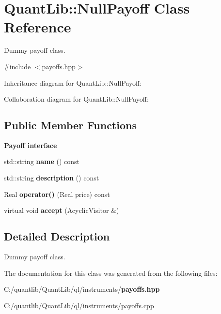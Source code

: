 \section{Quant\+Lib\+:\+:Null\+Payoff Class Reference}
\label{class_quant_lib_1_1_null_payoff}


Dummy payoff class.  




{\ttfamily \#include $<$payoffs.\+hpp$>$}



Inheritance diagram for Quant\+Lib\+:\+:Null\+Payoff\+:


Collaboration diagram for Quant\+Lib\+:\+:Null\+Payoff\+:
\subsection*{Public Member Functions}
\begin{Indent}{\bf Payoff interface}\par
\begin{DoxyCompactItemize}
\item 
std\+::string {\bfseries name} () const \label{class_quant_lib_1_1_null_payoff_ad948fc2e0307fddb618fe733be82674a}

\item 
std\+::string {\bfseries description} () const \label{class_quant_lib_1_1_null_payoff_ae92e9e192633e9224ef880dd61c6054e}

\item 
Real {\bfseries operator()} (Real price) const \label{class_quant_lib_1_1_null_payoff_aeaefced00df8935ea3833d38a248151e}

\item 
virtual void {\bfseries accept} (Acyclic\+Visitor \&)\label{class_quant_lib_1_1_null_payoff_a7910b82831b6dd8bcfb4c9bd6dd42237}

\end{DoxyCompactItemize}
\end{Indent}


\subsection{Detailed Description}
Dummy payoff class. 

The documentation for this class was generated from the following files\+:\begin{DoxyCompactItemize}
\item 
C\+:/quantlib/\+Quant\+Lib/ql/instruments/{\bf payoffs.\+hpp}\item 
C\+:/quantlib/\+Quant\+Lib/ql/instruments/payoffs.\+cpp\end{DoxyCompactItemize}
